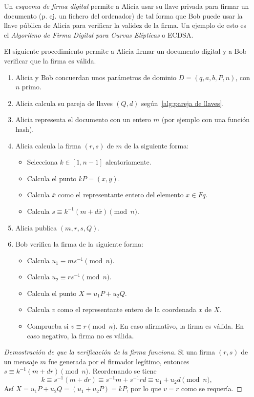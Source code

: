 Un \emph{esquema de firma digital} permite a Alicia usar su llave privada para firmar un documento (p. ej. un fichero del ordenador) de tal forma que Bob puede usar la llave pública de Alicia para verificar la validez de la firma. Un ejemplo de esto es el \emph{Algoritmo de Firma Digital para Curvas Elípticas} o ECDSA.

\begin{protocolo}[ECDSA]
    El siguiente procedimiento permite a Alicia firmar un documento digital y a Bob verificar que la firma es válida.
    \begin{enumerate}
        \item Alicia y Bob concuerdan unos parámetros de dominio $D = (q, a, b, P, n)$, con $n$ primo.
        \item Alicia calcula su pareja de llaves $(Q, d)$ según~\ref{alg:pareja de llaves}.
        \item Alicia representa el documento con un entero $m$ (por ejemplo con una función hash).
        \item Alicia calcula la firma $(r, s)$ de $m$ de la siguiente forma:
        \begin{itemize}
            \item Selecciona $k \in [1, n - 1]$ aleatoriamente.
            \item Calcula el punto $k P = (x, y)$.
            \item Calcula $\overline{x}$ como el representante entero del elemento $x \in Fq$.
            \item Calcula $s \equiv k^{-1} (m + d \overline{x}) \pmod{n}$.
        \end{itemize}
        \item Alicia publica $(m, r, s, Q)$.
        \item Bob verifica la firma de la siguiente forma:
        \begin{itemize}
            \item Calcula $u_1 \equiv m s^{-1} \pmod{n}$.
            \item Calcula $u_2 \equiv r s^{-1} \pmod{n}$.
            \item Calcula el punto $X = u_1 P + u_2 Q$.
            \item Calcula $v$ como el representante entero de la coordenada $x$ de $X$.
            \item Comprueba si $v \equiv r \pmod{n}$. En caso afirmativo, la firma es válida. En caso negativo, la firma no es válida.
        \end{itemize}
    \end{enumerate}
\end{protocolo}
\begin{proof}[Demostración de que la verificación de la firma funciona]
Si una firma $(r, s)$ de un mensaje $m$ fue generada por el firmador legítimo, entonces $s \equiv k^{-1} (m + d r) \pmod{n}$. Reordenando se tiene
$$
    k \equiv s^{-1} (m + d r) \equiv s^{-1} m + s^{-1} r d \equiv u_1 + u_2 d \pmod{n},
$$
Así $X = u_1 P + u_2 Q = (u_1 + u_2 P) = k P$, por lo que $v = r$ como se requería.
\end{proof}

